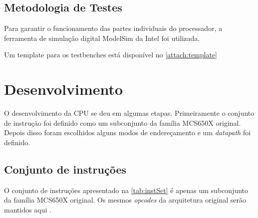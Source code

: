 \documentclass[
	12pt,				  %
	openright,		%
	a4paper,			%
	english,			%
	french,				%
	spanish,			%
	brazil,				%
]{abntex2}
\begin{document}

\section{Metodologia de Testes}

Para garantir o funcionamento das partes individuais do processador, a ferramenta
de simulação digital ModelSim da Intel foi utilizada.

Um template para os testbenches está disponível no \autoref{attach:template}

\chapter{Desenvolvimento}

O desenvolvimento da CPU se deu em algumas etapas. Primeiramente o conjunto de
instrução foi definido como um subconjunto da família MCS650X original. Depois
disso foram escolhidos alguns modos de endereçamento e um \emph{datapath} foi
definido.

\section{Conjunto de instruções}
O conjunto de instruções apresentado na \autoref{tab:instSet} é apenas um
subconjunto da família MCS650X original. Os mesmos \emph{opcodes} da arquitetura
original serão mantidos aqui \cite{6502isa}.
\end{document}
